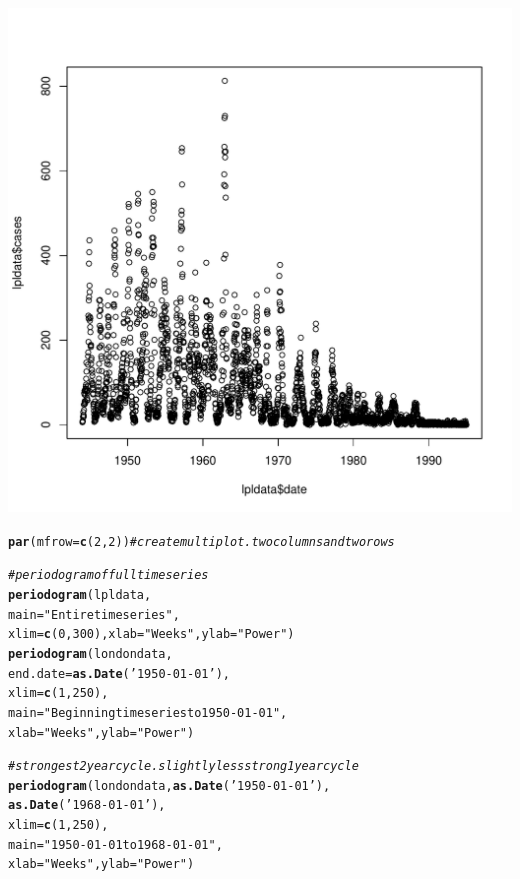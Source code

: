 \documentclass[12pt]{article}\usepackage[]{graphicx}\usepackage[]{color}
\makeatletter
\def\maxwidth{ %
  \ifdim\Gin@nat@width>\linewidth
    \linewidth
  \else
    \Gin@nat@width
  \fi
}
\newcommand{\hlnum}[1]{\textcolor[rgb]{0.686,0.059,0.569}{#1}}%
\newcommand{\hlstr}[1]{\textcolor[rgb]{0.192,0.494,0.8}{#1}}%
\newcommand{\hlcom}[1]{\textcolor[rgb]{0.678,0.584,0.686}{\textit{#1}}}%
\newcommand{\hlstd}[1]{\textcolor[rgb]{0.345,0.345,0.345}{#1}}%
\newcommand{\hlkwc}[1]{\textcolor[rgb]{0.333,0.667,0.333}{#1}}%
\newcommand{\hlkwd}[1]{\textcolor[rgb]{0.737,0.353,0.396}{\textbf{#1}}}%
\newenvironment{kframe}{%
 \def\at@end@of@kframe{}%
 \ifinner\ifhmode%
  \def\at@end@of@kframe{\end{minipage}}%
  \begin{minipage}{\columnwidth}%
 \fi\fi%
 \def\FrameCommand##1{\hskip\@totalleftmargin \hskip-\fboxsep
 \colorbox{shadecolor}{##1}\hskip-\fboxsep
     \hskip-\linewidth \hskip-\@totalleftmargin \hskip\columnwidth}%
 \MakeFramed {\advance\hsize-\width
   \@totalleftmargin\z@ \linewidth\hsize
   \@setminipage}}%
 {\par\unskip\endMakeFramed%
 \at@end@of@kframe}
\newenvironment{knitrout}{}{} %
\makeatother
\begin{document}
\begin{enumerate}[(a)]
\begin{knitrout}
\includegraphics[width=\maxwidth]{figure/unnamed-chunk-5-1} 
\begin{kframe}\begin{alltt}
\hlkwd{par}\hlstd{(}\hlkwc{mfrow}\hlstd{=}\hlkwd{c}\hlstd{(}\hlnum{2}\hlstd{,}\hlnum{2}\hlstd{))} \hlcom{#create multiplot. two columns and two rows}

\hlcom{#periodogram of full time series}
\hlkwd{periodogram}\hlstd{(lpldata,}
            \hlkwc{main}\hlstd{=}\hlstr{"Entire timeseries"}\hlstd{,}
            \hlkwc{xlim}\hlstd{=}\hlkwd{c}\hlstd{(}\hlnum{0}\hlstd{,}\hlnum{300}\hlstd{),}\hlkwc{xlab}\hlstd{=}\hlstr{"Weeks"}\hlstd{,} \hlkwc{ylab}\hlstd{=}\hlstr{"Power"}\hlstd{)}
\hlkwd{periodogram}\hlstd{(londondata,}
            \hlkwc{end.date}\hlstd{=}\hlkwd{as.Date}\hlstd{(}\hlstr{'1950-01-01'}\hlstd{),}
            \hlkwc{xlim}\hlstd{=}\hlkwd{c}\hlstd{(}\hlnum{1}\hlstd{,}\hlnum{250}\hlstd{),}
            \hlkwc{main}\hlstd{=}\hlstr{"Beginning timeseries to 1950-01-01"}\hlstd{,}
            \hlkwc{xlab}\hlstd{=}\hlstr{"Weeks"}\hlstd{,} \hlkwc{ylab}\hlstd{=}\hlstr{"Power"}\hlstd{)}

\hlcom{#strongest 2 year cycle. slightly less strong 1 year cycle}
\hlkwd{periodogram}\hlstd{(londondata,}\hlkwd{as.Date}\hlstd{(}\hlstr{'1950-01-01'}\hlstd{),}
            \hlkwd{as.Date}\hlstd{(}\hlstr{'1968-01-01'}\hlstd{),}
            \hlkwc{xlim}\hlstd{=}\hlkwd{c}\hlstd{(}\hlnum{1}\hlstd{,}\hlnum{250}\hlstd{),}
            \hlkwc{main}\hlstd{=}\hlstr{"1950-01-01 to 1968-01-01"}\hlstd{,}
            \hlkwc{xlab}\hlstd{=}\hlstr{"Weeks"}\hlstd{,} \hlkwc{ylab}\hlstd{=}\hlstr{"Power"}\hlstd{)}


\end{alltt}
\end{kframe}
\end{knitrout}
\end{enumerate}
\end{document}
